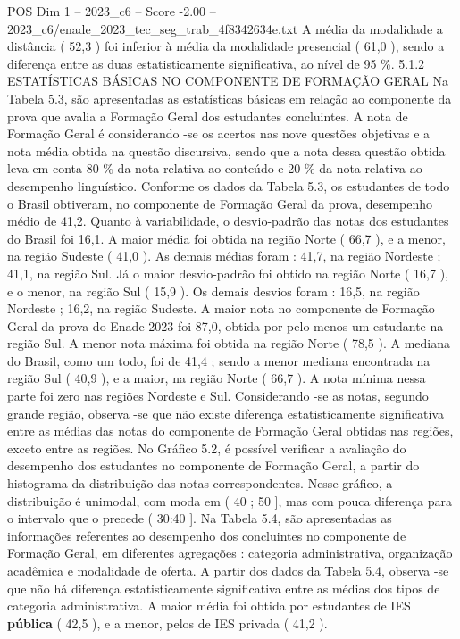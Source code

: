 \begin{textsample}{POS Dim 1 – 2023\_c6 – Score -2.00 – 2023\_c6/enade\_2023\_tec\_seg\_trab\_4f8342634e.txt}
A média da modalidade a distância ( 52,3 ) foi inferior à média da modalidade presencial ( 61,0 ), sendo a diferença entre as duas estatisticamente significativa, ao nível de 95 \%. 5.1.2 ESTATÍSTICAS BÁSICAS NO COMPONENTE DE FORMAÇÃO GERAL Na Tabela 5.3, são apresentadas as estatísticas básicas em relação ao componente da prova que avalia a Formação Geral dos estudantes concluintes.
A nota de Formação Geral é considerando -se os acertos nas nove questões objetivas e a nota média obtida na questão discursiva, sendo que a nota dessa questão obtida leva em conta 80 \% da nota relativa ao conteúdo e 20 \% da nota relativa ao desempenho linguístico.
Conforme os dados da Tabela 5.3, os estudantes de todo o Brasil obtiveram, no componente de Formação Geral da prova, desempenho médio de 41,2.
Quanto à variabilidade, o desvio-padrão das notas dos estudantes do Brasil foi 16,1.
A maior média foi obtida na região Norte ( 66,7 ), e a menor, na região Sudeste ( 41,0 ).
As demais médias foram : 41,7, na região Nordeste ; 41,1, na região Sul.
Já o maior desvio-padrão foi obtido na região Norte ( 16,7 ), e o menor, na região Sul ( 15,9 ).
Os demais desvios foram : 16,5, na região Nordeste ; 16,2, na região Sudeste.
A maior nota no componente de Formação Geral da prova do Enade 2023 foi 87,0, obtida por pelo menos um estudante na região Sul.
A menor nota máxima foi obtida na região Norte ( 78,5 ).
A mediana do Brasil, como um todo, foi de 41,4 ; sendo a menor mediana encontrada na região Sul ( 40,9 ), e a maior, na região Norte ( 66,7 ).
A nota mínima nessa parte foi zero nas regiões Nordeste e Sul.
Considerando -se as notas, segundo grande região, observa -se que não existe diferença estatisticamente significativa entre as médias das notas do componente de Formação Geral obtidas nas regiões, exceto entre as regiões.
No Gráfico 5.2, é possível verificar a avaliação do desempenho dos estudantes no componente de Formação Geral, a partir do histograma da distribuição das notas correspondentes.
Nesse gráfico, a distribuição é unimodal, com moda em ( 40 ; 50 ], mas com pouca diferença para o intervalo que o precede ( 30:40 ].
Na Tabela 5.4, são apresentadas as informações referentes ao desempenho dos concluintes no componente de Formação Geral, em diferentes agregações : categoria administrativa, organização acadêmica e modalidade de oferta.
A partir dos dados da Tabela 5.4, observa -se que não há diferença estatisticamente significativa entre as médias dos tipos de categoria administrativa.
A maior média foi obtida por estudantes de IES \textbf{pública} ( 42,5 ), e a menor, pelos de IES privada ( 41,2 ).

\end{textsample}
